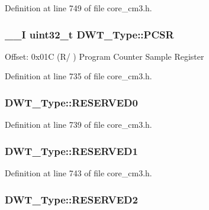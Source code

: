 Definition at line 749 of file core\-\_\-cm3.\-h.

\hypertarget{struct_d_w_t___type_abc5ae11d98da0ad5531a5e979a3c2ab5}{
\subsubsection[{P\-C\-S\-R}]{\setlength{\rightskip}{0pt plus 5cm}\-\_\-\-\_\-\-I {\bf uint32\-\_\-t} D\-W\-T\-\_\-\-Type\-::\-P\-C\-S\-R}}\label{struct_d_w_t___type_abc5ae11d98da0ad5531a5e979a3c2ab5}
Offset\-: 0x01\-C (R/ ) Program Counter Sample Register 

Definition at line 735 of file core\-\_\-cm3.\-h.

\hypertarget{struct_d_w_t___type_a6c8192f8c8ba9e3f2071592ed4b9683e}{
\subsubsection[{R\-E\-S\-E\-R\-V\-E\-D0}]{ D\-W\-T\-\_\-\-Type\-::\-R\-E\-S\-E\-R\-V\-E\-D0}}\label{struct_d_w_t___type_a6c8192f8c8ba9e3f2071592ed4b9683e}


Definition at line 739 of file core\-\_\-cm3.\-h.

\hypertarget{struct_d_w_t___type_ad7538b35060142816020e3a0666a728b}{
\subsubsection[{R\-E\-S\-E\-R\-V\-E\-D1}]{ D\-W\-T\-\_\-\-Type\-::\-R\-E\-S\-E\-R\-V\-E\-D1}}\label{struct_d_w_t___type_ad7538b35060142816020e3a0666a728b}


Definition at line 743 of file core\-\_\-cm3.\-h.

\hypertarget{struct_d_w_t___type_aa41f638774439cbc6b03a983d3ac7991}{
\subsubsection[{R\-E\-S\-E\-R\-V\-E\-D2}]{ D\-W\-T\-\_\-\-Type\-::\-R\-E\-S\-E\-R\-V\-E\-D2}}\label{struct_d_w_t___type_aa41f638774439cbc6b03a983d3ac7991}


